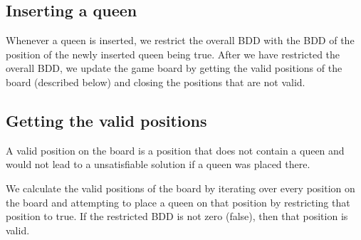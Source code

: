 \subsection{Inserting a queen}
Whenever a queen is inserted, we restrict the overall BDD with the BDD of the position of the newly inserted queen being true. After we have restricted the overall BDD, we update the game board by getting the valid positions of the board (described below) and closing the positions that are not valid.

\subsection{Getting the valid positions}
A valid position on the board is a position that does not contain a queen and would not lead to a unsatisfiable solution if a queen was placed there.

We calculate the valid positions of the board by iterating over every position on the board and attempting to place a queen on that position by restricting that position to true. If the restricted BDD is not zero (false), then that position is valid.
